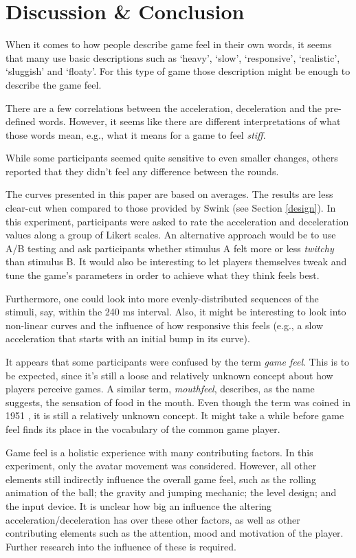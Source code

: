 \section{Discussion \& Conclusion} \label{discussion}
When it comes to how people describe game feel in their own words, it seems that many use basic descriptions such as `heavy', `slow', `responsive', `realistic', `sluggish' and `floaty'. For this type of game those description might be enough to describe the game feel.

There are a few correlations between the acceleration, deceleration and the pre-defined words. However, it seems like there are different interpretations of what those words mean, e.g., what it means for a game to feel \textit{stiff}.

While some participants seemed quite sensitive to even smaller changes, others reported that they didn't feel any difference between the rounds.

The curves presented in this paper are based on averages. The results are less clear-cut when compared to those provided by Swink (see Section \ref{design}). In this experiment, participants were asked to rate the acceleration and deceleration values along a group of Likert scales. An alternative approach would be to use A/B testing and ask participants whether stimulus A felt more or less \textit{twitchy} than stimulus B. It would also be interesting to let players themselves tweak and tune the game's parameters in order to achieve what they think feels best.

Furthermore, one could look into more evenly-distributed sequences of the stimuli, say, within the 240 ms interval. Also, it might be interesting to look into non-linear curves and the influence of how responsive this feels (e.g., a slow acceleration that starts with an initial bump in its curve).

It appears that some participants were confused by the term \textit{game feel}. This is to be expected, since it's still a loose and relatively unknown concept about how players perceive games. A similar term, \textit{mouthfeel}, describes, as the name suggests, the sensation of food in the mouth. Even though the term was coined in 1951 \cite{mouthfeel}, it is still a relatively unknown concept. It might take a while before game feel finds its place in the vocabulary of the common game player.

Game feel is a holistic experience with many contributing factors. In this experiment, only the avatar movement was considered. However, all other elements still indirectly influence the overall game feel, such as the rolling animation of the ball; the gravity and jumping mechanic; the level design; and the input device. It is unclear how big an influence the altering acceleration/deceleration has over these other factors, as well as other contributing elements such as the attention, mood and motivation of the player. Further research into the influence of these is required.